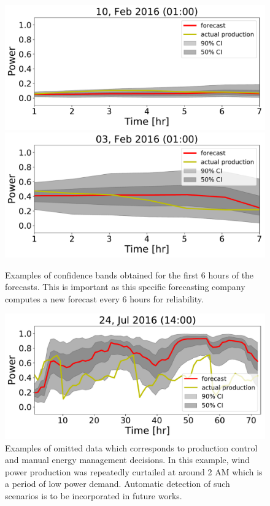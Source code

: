 \documentclass[10pt,twocolumn,letterpaper]{article}
\begin{document}
\begin{figure}[t]
\begin{center}
   \includegraphics[width=0.8\linewidth]{6hr_forecast_CI_75.pdf}  %
   \includegraphics[width=0.8\linewidth]{6hr_forecast_CI_59.pdf}
\end{center}
   \caption{ Examples of confidence bands obtained for the first 6 hours of the forecasts. This is important as this specific forecasting company computes a new forecast every 6 hours for reliability.}
\label{fig:6hr}
\end{figure}


 \begin{figure}[t]
\begin{center}
   \includegraphics[width=0.8\linewidth]{72hr_forecast_CI_623.pdf}  %
\end{center}
   \caption{ Examples of omitted data which corresponds to production control and manual energy management decisions. In this example,  wind power production was repeatedly curtailed at around 2 AM which is a period of low power demand. Automatic detection of such scenarios is to be incorporated in future works.}
\label{fig:6hr}
\end{figure}
\end{document}
